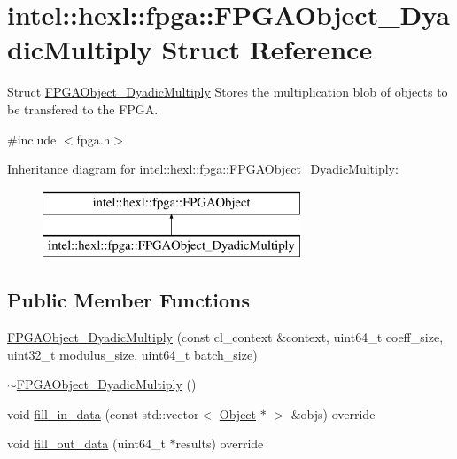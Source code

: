 \hypertarget{structintel_1_1hexl_1_1fpga_1_1FPGAObject__DyadicMultiply}{\section{intel\-:\-:hexl\-:\-:fpga\-:\-:F\-P\-G\-A\-Object\-\_\-\-Dyadic\-Multiply Struct Reference}
\label{structintel_1_1hexl_1_1fpga_1_1FPGAObject__DyadicMultiply}
}


Struct \hyperlink{structintel_1_1hexl_1_1fpga_1_1FPGAObject__DyadicMultiply}{F\-P\-G\-A\-Object\-\_\-\-Dyadic\-Multiply} Stores the multiplication blob of objects to be transfered to the F\-P\-G\-A.  




{\ttfamily \#include $<$fpga.\-h$>$}

Inheritance diagram for intel\-:\-:hexl\-:\-:fpga\-:\-:F\-P\-G\-A\-Object\-\_\-\-Dyadic\-Multiply\-:\begin{figure}[H]
\begin{center}
\leavevmode
\includegraphics[height=2.000000cm]{structintel_1_1hexl_1_1fpga_1_1FPGAObject__DyadicMultiply}
\end{center}
\end{figure}
\subsection*{Public Member Functions}
\begin{DoxyCompactItemize}
\item 
\hyperlink{structintel_1_1hexl_1_1fpga_1_1FPGAObject__DyadicMultiply_a2246da0a69a18053fe76d8d5b07a3b14}{F\-P\-G\-A\-Object\-\_\-\-Dyadic\-Multiply} (const cl\-\_\-context \&context, uint64\-\_\-t coeff\-\_\-size, uint32\-\_\-t modulus\-\_\-size, uint64\-\_\-t batch\-\_\-size)
\item 
\hyperlink{structintel_1_1hexl_1_1fpga_1_1FPGAObject__DyadicMultiply_adba71553a77b8e2dea74e6c33fde39f5}{$\sim$\-F\-P\-G\-A\-Object\-\_\-\-Dyadic\-Multiply} ()
\item 
void \hyperlink{structintel_1_1hexl_1_1fpga_1_1FPGAObject__DyadicMultiply_aa4f825403efabeffbf3c9eee6cf0ecb1}{fill\-\_\-in\-\_\-data} (const std\-::vector$<$ \hyperlink{structintel_1_1hexl_1_1fpga_1_1Object}{Object} $\ast$ $>$ \&objs) override
\item 
void \hyperlink{structintel_1_1hexl_1_1fpga_1_1FPGAObject__DyadicMultiply_a2a95c53a7a8bcca57da535a5ad6e7692}{fill\-\_\-out\-\_\-data} (uint64\-\_\-t $\ast$results) override
\end{DoxyCompactItemize}
